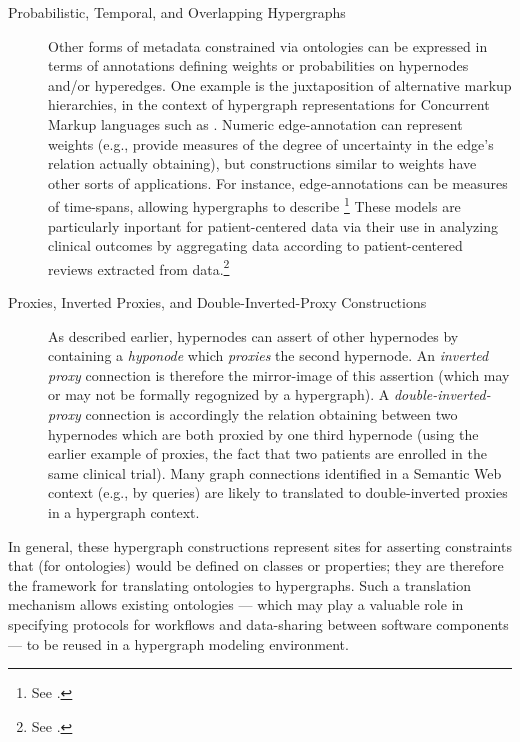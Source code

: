 {\begin{description}
\item[Probabilistic, Temporal, and Overlapping Hypergraphs]
Other forms of metadata constrained via ontologies 
can be expressed in terms of annotations 
defining weights or probabilities on 
hypernodes and/or hyperedges.  One example is 
the juxtaposition of alternative markup hierarchies, 
in the context of hypergraph representations for 
Concurrent Markup languages such as \TAGML{}.  
Numeric edge-annotation can represent 
weights (e.g., provide measures of the degree 
of uncertainty in the edge's relation actually 
obtaining), but constructions similar to 
weights have other sorts of applications.  
For instance, edge-annotations can be measures 
of time-spans, allowing hypergraphs to 
describe \footnote{See 
.}  These models are particularly inportant 
for patient-centered data via their use in 
analyzing clinical outcomes by aggregating data 
according to patient-centered reviews 
extracted from \EHR{} 
data.\footnote{See .}
  
\item[Proxies, Inverted Proxies, and Double-Inverted-Proxy Constructions]
As described earlier, hypernodes can assert  of 
other hypernodes by containing a \textit{hyponode} which 
\textit{proxies} the second hypernode.  
An \textit{inverted proxy} connection is therefore 
the mirror-image of this assertion 
(which may or may not be formally regognized 
by a hypergraph).  A \textit{double-inverted-proxy} 
connection is accordingly the relation obtaining 
between two hypernodes which are both proxied by 
one third hypernode (using the earlier example 
of proxies, the fact that two patients 
are enrolled in the same clinical trial).  
Many graph connections identified in a 
Semantic Web context (e.g., by \SPARQL{} queries) 
are likely to translated to double-inverted proxies 
in a hypergraph context.  
\end{description}

In general, these hypergraph constructions represent 
sites for asserting constraints that 
(for \RDF{} ontologies) would be defined on 
classes or properties; they are therefore 
the framework for translating \RDF{} ontologies 
to hypergraphs.  Such a translation 
mechanism allows existing ontologies 
--- which may play a valuable role 
in specifying protocols for workflows 
and data-sharing between software components  
--- to be reused in a hypergraph modeling environment.}


